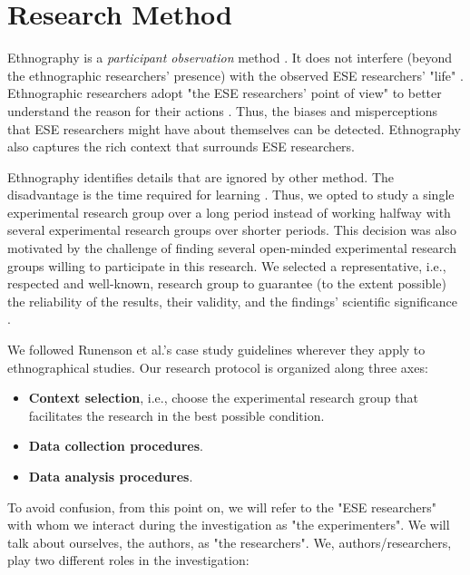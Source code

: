 \section{Research Method}\label{sec-research-method}

Ethnography is a \textit{participant observation} method . It does not interfere (beyond the ethnographic researchers' presence) with the observed ESE researchers' "life" \cite{Sharp-2016-Ethnographic-Studies-ESE}. Ethnographic researchers adopt "the ESE researchers' point of view" to better understand the reason for their actions \cite[pp. 55-56]{Outhwaite-2007-sage}. Thus, the biases and misperceptions that ESE researchers might have about themselves can be detected. Ethnography also captures the rich context that surrounds ESE researchers.

Ethnography identifies details that are ignored by  other method. The disadvantage is the time required for learning \cite{Sharp-2016-Ethnographic-Studies-ESE}. Thus, we opted to study a single experimental research group over a long period instead of working halfway with several experimental research groups over shorter periods. This decision was also motivated by the challenge of finding several open-minded experimental research groups willing to participate in this research. We selected a representative, i.e., respected and well-known, research group to guarantee (to the extent possible) the reliability of the results, their validity, and the findings' scientific significance \cite{sjoberg-2007-future-empical-methods}.

We followed Runenson et al.'s case study guidelines \cite{Runenson-2012-case-study-SE} wherever they apply to ethnographical studies. Our research protocol is organized along three axes:

\begin{itemize}
	\item \textbf{Context selection}, i.e., choose the experimental research group that facilitates the research in the best possible condition.
    \item \textbf{Data collection procedures}.
    \item \textbf{Data analysis procedures}.
\end{itemize}

To avoid confusion, from this point on, we will refer to the "ESE researchers" with whom we interact during the investigation as "the experimenters". We will talk about ourselves, the authors, as "the researchers". We, authors/researchers, play two different roles in the investigation:

